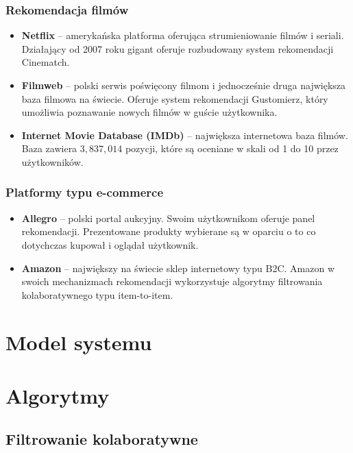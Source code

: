 \documentclass[twoside]{iisthesis}
\begin{document}
		 \subsection{Rekomendacja filmów}
		 \begin{itemize}
			 \item \textbf{Netflix} -- amerykańska platforma oferująca strumieniowanie filmów i seriali. Działający od 2007 roku gigant oferuje rozbudowany system rekomendacji Cinematch\cite{id:aStreamOfMovies}. 
			 \item \textbf{Filmweb} -- polski serwis poświęcony filmom i jednocześnie druga największa baza filmowa na świecie. Oferuje system rekomendacji Gustomierz, który umożliwia poznawanie nowych filmów w guście użytkownika\cite{id:filmwebfaq}.
			 \item \textbf{Internet Movie Database (IMDb)} -- największa internetowa baza filmów. Baza zawiera $3,837,014$ pozycji, które są oceniane w skali od 1 do 10 przez użytkowników\cite{id:imdbstats}.
		 \end{itemize}
		 
		 \subsection{Platformy typu e-commerce}
	
		\begin{itemize}
			 \item \textbf{Allegro} -- polski portal aukcyjny. Swoim użytkownikom oferuje panel rekomendacji. Prezentowane produkty wybierane są w oparciu o to co dotychczas kupował i oglądał użytkownik\cite{id:allegrofaq}. 
			 \item \textbf{Amazon} -- największy na świecie sklep internetowy typu B2C. Amazon w swoich mechanizmach rekomendacji wykorzystuje algorytmy filtrowania kolaboratywnego typu item-to-item\cite{id:linden2003amazon}.
		 \end{itemize}	 
	  
 
 \chapter{Model systemu}
 
 \chapter{Algorytmy}
	 \section{Filtrowanie kolaboratywne}
\end{document}
